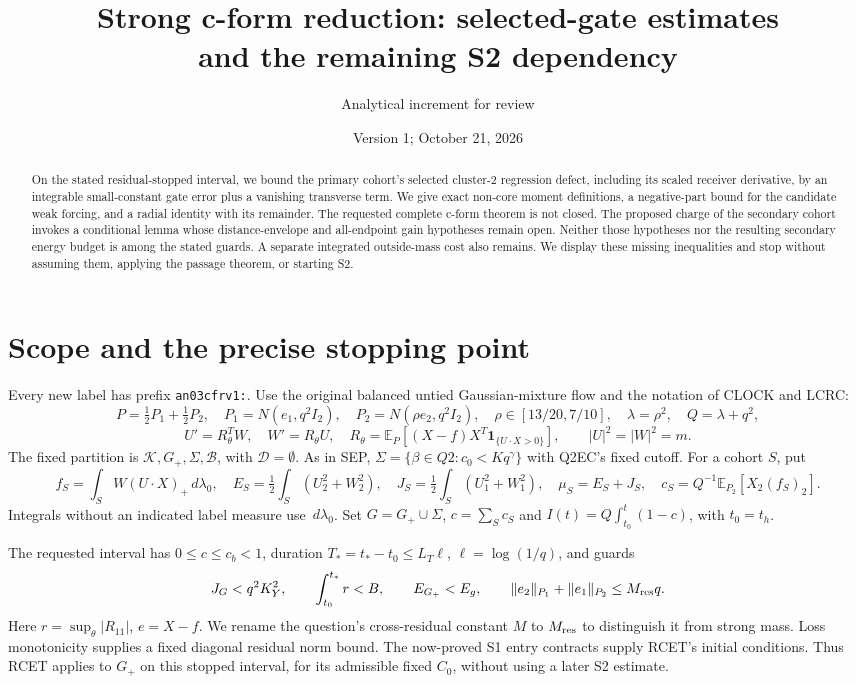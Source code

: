 \documentclass[11pt]{article}
\title{Strong c-form reduction: selected-gate estimates\\
and the remaining S2 dependency}
\author{Analytical increment for review}
\date{Version 1; October 21, 2026}
\theoremstyle{remark}\newtheorem{remark}[proposition]{Remark}
\newcommand{\E}{\mathbb E}
\newcommand{\dd}{\,d}
\newcommand{\one}{\mathbf1}
\newcommand{\Gp}{G_+}
\newcommand{\KK}{\mathcal K}
\newcommand{\BB}{\mathcal B}
\begin{document}
\maketitle
\begin{abstract}
On the stated residual-stopped interval, we bound the primary
cohort's selected cluster-2 regression defect, including its
scaled receiver derivative, by an integrable small-constant
gate error plus a vanishing transverse term. We give exact
non-core moment definitions, a negative-part bound for the
candidate weak forcing, and a radial identity with its remainder.
The requested complete c-form theorem is not closed.
The proposed charge of the secondary cohort invokes a
conditional lemma whose distance-envelope and all-endpoint
gain hypotheses remain open. Neither those hypotheses nor
the resulting secondary energy budget is among the stated
guards. A separate integrated outside-mass cost also remains.
We display these missing inequalities and stop without
assuming them, applying the passage theorem, or starting S2.
\end{abstract}

\section{Scope and the precise stopping point}
Every new label has prefix \texttt{an03cfrv1:}.
Use the original balanced untied Gaussian-mixture flow and the
notation of CLOCK and LCRC:
\[
 P=\tfrac12P_1+\tfrac12P_2,\quad
 P_1=N(e_1,q^2I_2),\quad P_2=N(\rho e_2,q^2I_2),\quad
 \rho\in[13/20,7/10],\quad \lambda=\rho^2,\quad Q=\lambda+q^2,
\]
\[
 U'=R_\theta^TW,\quad W'=R_\theta U,\quad
 R_\theta=\E_P[(X-f)X^T\one_{\{U\cdot X>0\}}],
 \qquad |U|^2=|W|^2=m .
\]
The fixed partition is $\KK,\Gp,\Sigma,\BB$, with
$\mathcal D=\emptyset$. As in SEP,
$\Sigma=\{\beta\in Q2:c_0<Kq^\gamma\}$ with Q2EC's fixed cutoff.
For a cohort $S$, put
\[
 f_S=\int_S W(U\cdot X)_+\dd\lambda_0,\quad
 E_S=\tfrac12\int_S(U_2^2+W_2^2),\quad
 J_S=\tfrac12\int_S(U_1^2+W_1^2),\quad \mu_S=E_S+J_S,
 \quad c_S=Q^{-1}\E_{P_2}[X_2(f_S)_2].
\]
Integrals without an indicated label measure use $\dd\lambda_0$.
Set $G=\Gp\cup\Sigma$, $c=\sum_Sc_S$ and
$I(t)=Q\int_{t_0}^t(1-c)$, with $t_0=t_h$.

The requested interval has $0\le c\le c_b<1$, duration
$T_*=t_*-t_0\le L_T\ell$, $\ell=\log(1/q)$, and guards
\begin{equation}
 J_G<q^2K_Y^2,\qquad \int_{t_0}^{t_*}r<B,\qquad
 E_{\Gp}<E_g,\qquad
 \|e_2\|_{P_1}+\|e_1\|_{P_2}\le M_{\rm res}q .
 \label{an03cfrv1:guards}
\end{equation}
Here $r=\sup_\theta|R_{11}|$, $e=X-f$.
We rename the question's cross-residual constant $M$ to
$M_{\rm res}$ to distinguish it from strong mass.
Loss monotonicity supplies a fixed diagonal residual norm bound.
The now-proved S1 entry contracts supply RCET's initial conditions.
Thus RCET applies to $\Gp$ on this stopped interval, for its
admissible fixed $C_0$, without using a later S2 estimate.
\end{document}
